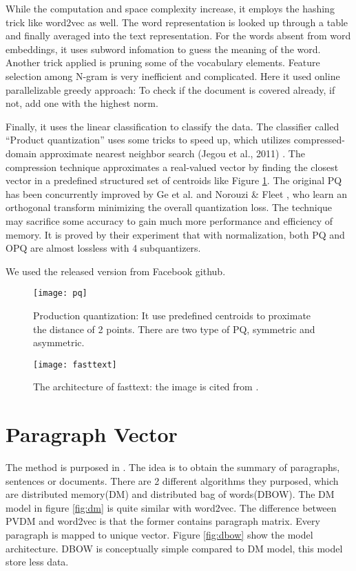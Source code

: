 While the computation and space complexity increase, it employs the hashing trick like word2vec as well. 
The word representation is looked up through a table and finally averaged into the text representation. 
For the words absent from word embeddings, it uses subword infomation\cite{bojanowski2016enriching} to guess the meaning of the word.
Another trick applied is pruning some of the vocabulary elements. Feature selection among N-gram is very inefficient and complicated.
Here it used online parallelizable greedy approach: To check if the document is covered already, if not, add one with the highest norm.

Finally, it uses the linear classification to classify the data. The classifier called \enquote{Product quantization} uses some tricks to speed up, which utilizes compressed-domain approximate nearest neighbor search (Jegou et al., 2011) \cite{jegou2011searching}.
The compression technique approximates a real-valued vector by finding the closest vector in a predefined structured set of centroids like Figure \ref{fig:pq}.
The original PQ has been concurrently improved by Ge et al. \cite{ge2013optimized} and Norouzi \& Fleet , who learn an orthogonal transform minimizing the overall quantization loss.
The technique may sacrifice some accuracy to gain much more performance and efficiency of memory. It is proved by their experiment that with normalization, both PQ and OPQ are almost lossless with 4 subquantizers. 

We used the released version from Facebook github.

\begin{figure}[h]
    \centering
	\texttt{[image: pq]}
    \caption{Production quantization: It use predefined centroids to proximate the distance of 2 points. There are two type of PQ, symmetric and asymmetric. }
    \label{fig:pq}
\end{figure}

\begin{figure}[h]
    \centering
	\texttt{[image: fasttext]}
    \caption{The architecture of fasttext: the image is cited from \cite{joulin2016fasttext}.}
    \label{fig:fasttext}
\end{figure}


\section{Paragraph Vector}
	
The method is purposed in \cite{PVDM}. The idea is to obtain the summary of paragraphs, sentences or documents. 
There are 2 different algorithms they purposed, which are distributed memory(DM) and distributed bag of words(DBOW). 
The DM model in figure \ref{fig:dm} is quite similar with word2vec. The difference between PVDM and word2vec is that the former contains paragraph matrix.
Every paragraph is mapped to unique vector. Figure \ref{fig:dbow} show the model architecture. DBOW is conceptually simple compared to DM model, this model store less data. 

